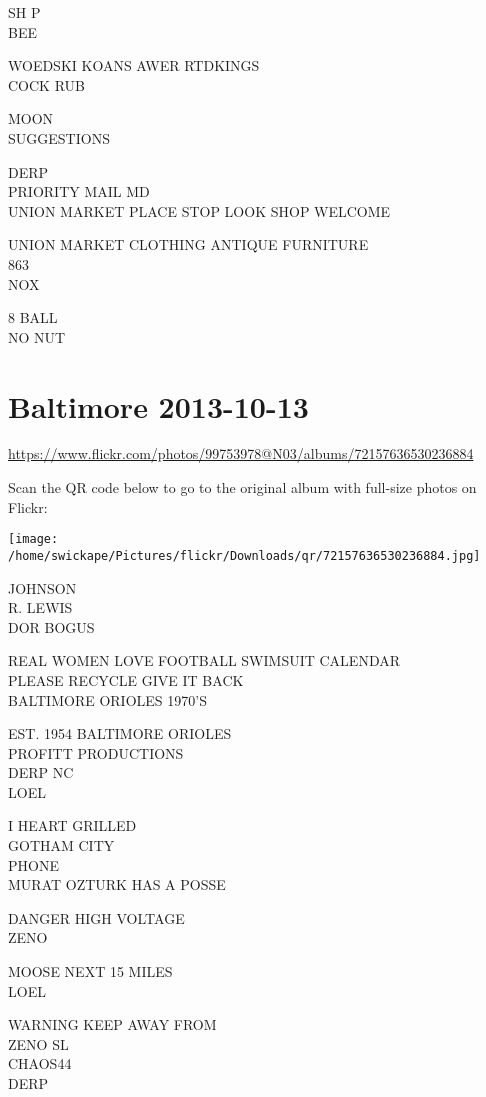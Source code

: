 \documentclass[10pt,letterpaper]{article}
\begin{document}
SH P\\
BEE

WOEDSKI KOANS AWER RTDKINGS\\
COCK RUB

MOON\\
SUGGESTIONS

DERP\\
PRIORITY MAIL MD\\
UNION MARKET PLACE STOP LOOK SHOP WELCOME

UNION MARKET CLOTHING ANTIQUE FURNITURE\\
863\\
NOX

8 BALL\\
NO NUT
\pagebreak

\section*{Baltimore 2013-10-13}

\url{https://www.flickr.com/photos/99753978@N03/albums/72157636530236884}

Scan the QR code below to go to the original album with full-size photos on Flickr:

\texttt{[image: /home/swickape/Pictures/flickr/Downloads/qr/72157636530236884.jpg]}
\pagebreak

JOHNSON\\
R. LEWIS\\
DOR BOGUS

REAL WOMEN LOVE FOOTBALL SWIMSUIT CALENDAR\\
PLEASE RECYCLE GIVE IT BACK\\
BALTIMORE ORIOLES 1970'S

EST. 1954 BALTIMORE ORIOLES\\
PROFITT PRODUCTIONS\\
DERP NC\\
LOEL

I HEART GRILLED\\
GOTHAM CITY\\
PHONE\\
MURAT OZTURK HAS A POSSE

DANGER HIGH VOLTAGE\\
ZENO

MOOSE NEXT 15 MILES\\
LOEL

WARNING KEEP AWAY FROM\\
ZENO SL\\
CHAOS44\\
DERP
\end{document}
